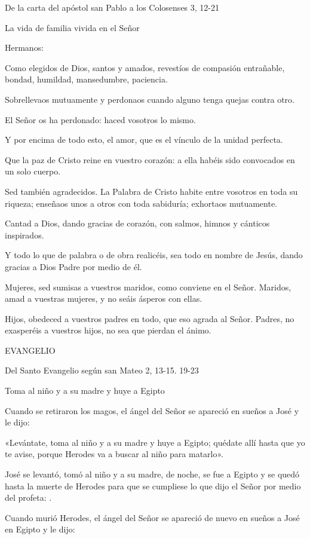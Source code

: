\begin{body}
\begin{body}
De la carta del apóstol san Pablo a los Colosenses 3, 12-21

La vida de familia vivida en el Señor

Hermanos:

Como elegidos de Dios, santos y amados, revestíos de compasión
entrañable, bondad, humildad, mansedumbre, paciencia.

Sobrellevaos mutuamente y perdonaos cuando alguno tenga quejas contra
otro.

El Señor os ha perdonado: haced vosotros lo mismo.

Y por encima de todo esto, el amor, que es el vínculo de la unidad
perfecta.

Que la paz de Cristo reine en vuestro corazón: a ella habéis sido
convocados en un solo cuerpo.

Sed también agradecidos. La Palabra de Cristo habite entre vosotros en
toda su riqueza; enseñaos unos a otros con toda sabiduría; exhortaos
mutuamente.

Cantad a Dios, dando gracias de corazón, con salmos, himnos y cánticos
inspirados.

Y todo lo que de palabra o de obra realicéis, sea todo en nombre de
Jesús, dando gracias a Dios Padre por medio de él.

Mujeres, sed sumisas a vuestros maridos, como conviene en el Señor.
Maridos, amad a vuestras mujeres, y no seáis ásperos con ellas.

Hijos, obedeced a vuestros padres en todo, que eso agrada al Señor.
Padres, no exasperéis a vuestros hijos, no sea que pierdan el ánimo.

EVANGELIO

Del Santo Evangelio según san Mateo 2, 13-15. 19-23

Toma al niño y a su madre y huye a Egipto

Cuando se retiraron los magos, el ángel del Señor se apareció en sueños
a José y le dijo:

«Levántate, toma al niño y a su madre y huye a Egipto; quédate allí
hasta que yo te avise, porque Herodes va a buscar al niño para matarlo».

José se levantó, tomó al niño y a su madre, de noche, se fue a Egipto y
se quedó hasta la muerte de Herodes para que se cumpliese lo que dijo el
Señor por medio del profeta: .

Cuando murió Herodes, el ángel del Señor se apareció de nuevo en sueños
a José en Egipto y le dijo:


\end{body}
\end{body}
